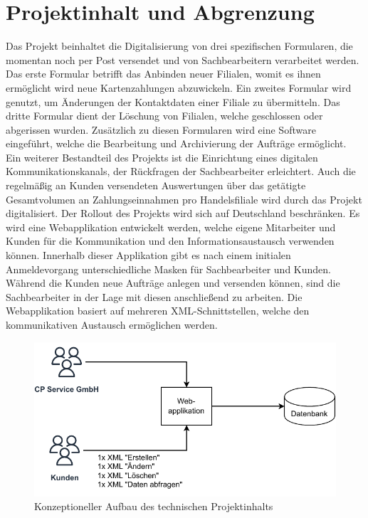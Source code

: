 \section{Projektinhalt und Abgrenzung}
Das Projekt beinhaltet die Digitalisierung von drei spezifischen Formularen, die momentan noch per Post versendet und von Sachbearbeitern verarbeitet werden. Das erste Formular betrifft das Anbinden neuer Filialen, womit es ihnen ermöglicht wird neue Kartenzahlungen abzuwickeln. 
Ein zweites Formular wird genutzt, um Änderungen der Kontaktdaten einer Filiale zu übermitteln. Das dritte Formular dient der Löschung von Filialen, welche geschlossen oder abgerissen wurden. 
Zusätzlich zu diesen Formularen wird eine Software eingeführt, welche die Bearbeitung und Archivierung der Aufträge ermöglicht. Ein weiterer Bestandteil des Projekts ist die Einrichtung eines digitalen Kommunikationskanals, der Rückfragen der Sachbearbeiter erleichtert. Auch die regelmäßig an Kunden versendeten Auswertungen über das getätigte Gesamtvolumen an Zahlungseinnahmen pro Handelsfiliale wird durch das Projekt digitalisiert. 
Der Rollout des Projekts wird sich auf Deutschland beschränken. Es wird eine Webapplikation entwickelt werden, welche eigene Mitarbeiter und Kunden für die Kommunikation und den Informationsaustausch verwenden können. Innerhalb dieser Applikation gibt es nach einem initialen Anmeldevorgang unterschiedliche Masken für Sachbearbeiter und Kunden. Während die Kunden neue Aufträge anlegen und versenden können, sind die Sachbearbeiter in der Lage mit diesen anschließend zu arbeiten. Die Webapplikation basiert auf mehreren XML-Schnittstellen, welche den kommunikativen Austausch ermöglichen werden.

\begin{figure}[h!]
	\centering 
	\includegraphics[scale=1]{img/konzept.pdf}
	\captionsetup{format=hang}
	\caption[Projektinhalt Skizze]{\label{fig:konzept} Konzeptioneller Aufbau des technischen Projektinhalts}
\end{figure}


